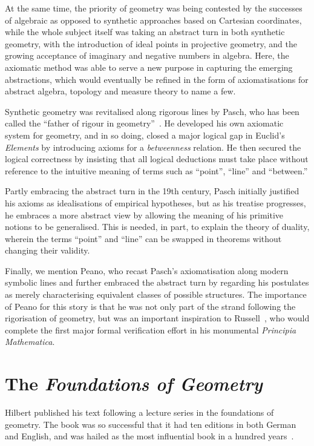 At the same time, the priority of geometry was being contested by the successes of algebraic as opposed to synthetic approaches based on Cartesian coordinates, while the whole subject itself was taking an abstract turn in both synthetic geometry, with the introduction of ideal points in projective geometry, and the growing acceptance of imaginary and negative numbers in algebra. Here, the axiomatic method was able to serve a new purpose in capturing the emerging abstractions, which would eventually be refined in the form of axiomatisations for abstract algebra, topology and measure theory to name a few.

Synthetic geometry was revitalised along rigorous lines by Pasch, who has been called the ``father of rigour in geometry''~\cite{PaschToPeano}. He developed his own axiomatic system for geometry, and in so doing, closed a major logical gap in Euclid's \emph{Elements} by introducing axioms for a \emph{betweenness} relation. He then secured the logical correctness by insisting that all logical deductions must take place without reference to the intuitive meaning of terms such as ``point'', ``line'' and ``between.'' 

Partly embracing the abstract turn in the 19th century, Pasch initially justified his axioms as idealisations of empirical hypotheses, but as his treatise progresses, he embraces a more abstract view by allowing the meaning of his primitive notions to be generalised. This is needed, in part, to explain the theory of duality, wherein the terms ``point'' and ``line'' can be swapped in theorems without changing their validity.

Finally, we mention Peano, who recast Pasch's axiomatisation along modern symbolic lines and further embraced the abstract turn by regarding his postulates as merely characterising equivalent classes of possible structures. The importance of Peano for this story is that he was not only part of the strand following the rigorisation of geometry, but was an important inspiration to Russell~\cite{PrinciplesOfMathematics}, who would complete the first major formal verification effort in his monumental \emph{Principia Mathematica}. 

\section{The \emph{Foundations of Geometry}}
Hilbert published his text following a lecture series in the foundations of geometry. The book was so successful that it had ten editions in both German and English, and was hailed as the most influential book in a hundred years~\cite{BirkhoffHilbertInfluence}. 


